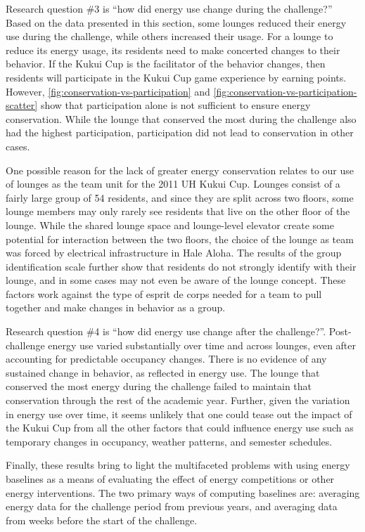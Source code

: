 Research question \#3 is ``how did energy use change during the challenge?'' Based on the data presented in this section, some lounges reduced their energy use during the challenge, while others increased their usage. For a lounge to reduce its energy usage, its residents need to make concerted changes to their behavior. If the Kukui Cup is the facilitator of the behavior changes, then residents will participate in the Kukui Cup game experience by earning points. However, \autoref{fig:conservation-vs-participation} and \autoref{fig:conservation-vs-participation-scatter} show that participation alone is not sufficient to ensure energy conservation. While the lounge that conserved the most during the challenge also had the highest participation, participation did not lead to conservation in other cases.

One possible reason for the lack of greater energy conservation relates to our use of lounges as the team unit for the 2011 UH Kukui Cup. Lounges consist of a fairly large group of 54 residents, and since they are split across two floors, some lounge members may only rarely see residents that live on the other floor of the lounge. While the shared lounge space and lounge-level elevator create some potential for interaction between the two floors, the choice of the lounge as team was forced by electrical infrastructure in Hale Aloha. The results of the group identification scale further show that residents do not strongly identify with their lounge, and in some cases may not even be aware of the lounge concept. These factors work against the type of esprit de corps needed for a team to pull together and make changes in behavior as a group.

Research question \#4 is ``how did energy use change after the challenge?''. Post-challenge energy use varied substantially over time and across lounges, even after accounting for predictable occupancy changes. There is no evidence of any sustained change in behavior, as reflected in energy use. The lounge that conserved the most energy during the challenge failed to maintain that conservation through the rest of the academic year. Further, given the variation in energy use over time, it seems unlikely that one could tease out the impact of the Kukui Cup from all the other factors that could influence energy use such as temporary changes in occupancy, weather patterns, and semester schedules.

Finally, these results bring to light the multifaceted problems with using energy baselines as a means of evaluating the effect of energy competitions or other energy interventions. The two primary ways of computing baselines are: averaging energy data for the challenge period from previous years, and averaging data from weeks before the start of the challenge.

